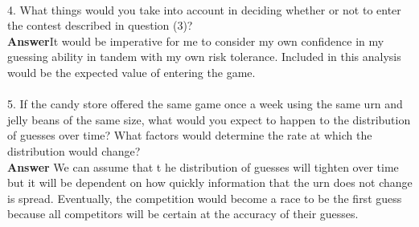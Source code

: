\documentclass[11pt]{article}
\begin{document}
\\
4. What things would you take into account in deciding whether or not to enter the contest described in question (3)?\\
\textbf{Answer}It would be imperative for me to consider my own confidence in my guessing ability in tandem with my own risk tolerance. Included in this analysis would be the expected value of entering the game.\\
\\
5. If the candy store offered the same game once a week using the same urn and jelly beans of the same size, what would you expect to happen to the distribution of guesses over time? What factors would determine the rate at which the distribution would change?\\
\textbf{Answer} We can assume that t he distribution of guesses will tighten over time but it will be dependent on how quickly information that the urn does not change is spread. Eventually, the competition would become a race to be the first guess because all competitors will be certain at the accuracy of their guesses.
\end{document}
